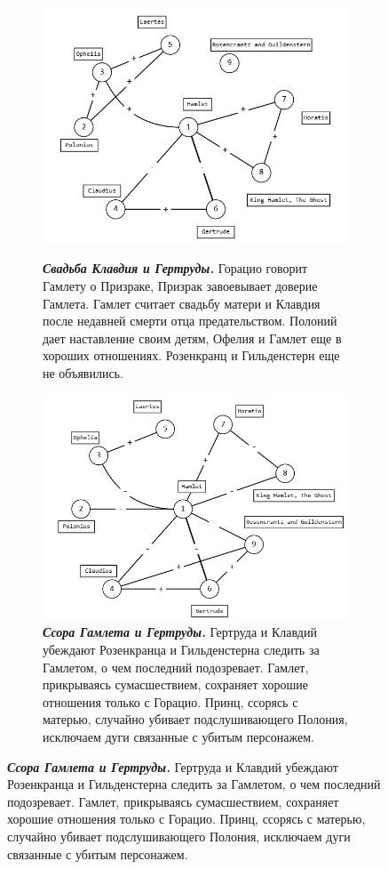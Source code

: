 \documentclass{article}
\begin{document}
\begin{enumerate}
\begin{figure}[ht]
    \centering
    \begin{subfigure}[t]{0.47\textwidth}
         \centering
         \caption{\small{\textit{\textbf{Свадьба Клавдия и Гертруды.}} Горацио говорит Гамлету о Призраке, Призрак завоевывает доверие Гамлета. Гамлет считает свадьбу матери и Клавдия после недавней смерти отца предательством. Полоний дает наставление своим детям, Офелия и Гамлет еще в хороших отношениях. Розенкранц и Гильденстерн еще не объявились.}}
         \includegraphics[width=\textwidth]{attachments/21/hamlet_1.png}
         \label{fig:21_1}
     \end{subfigure}
     \hfill
     \begin{subfigure}[t]{0.47\textwidth}
         \centering
         \caption{\small{\textit{\textbf{Ссора Гамлета и Гертруды.}} Гертруда и Клавдий убеждают Розенкранца и Гильденстерна следить за Гамлетом, о чем последний подозревает. Гамлет, прикрываясь сумасшествием, сохраняет хорошие отношения только с Горацио. Принц, ссорясь с матерью, случайно убивает подслушивающего Полония, исключаем дуги связанные с убитым персонажем.}}
         \includegraphics[width=\textwidth]{attachments/21/hamlet_2.png}

\end{subfigure}
\end{figure}
\end{enumerate}
\end{document}
